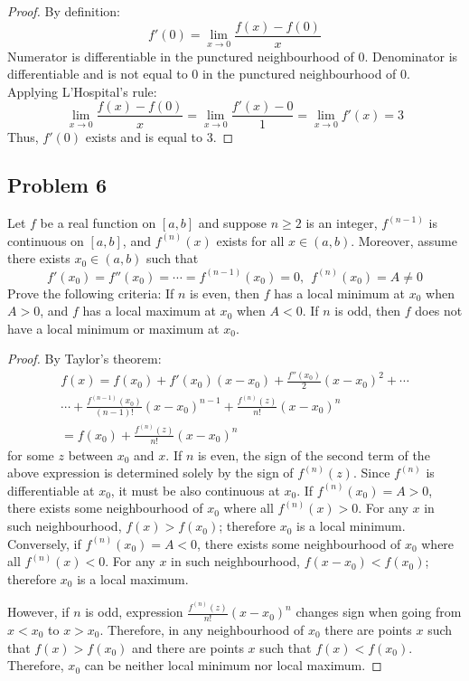 \documentclass{article}
\begin{document}
\begin{proof}

By definition:
\[ f'(0) = \lim_{x \to 0} \frac{f(x)-f(0)}{x} \]
Numerator is differentiable in the punctured neighbourhood of $0$.
Denominator is differentiable and is not equal to $0$ in the punctured neighbourhood of $0$.
Applying L'Hospital's rule:
\[ \lim_{x \to 0} \frac{f(x)-f(0)}{x} = \lim_{x \to 0} \frac{f'(x)-0}{1} =  \lim_{x \to 0} f'(x) = 3 \]
Thus, $f'(0)$ exists and is equal to $3$.

\end{proof}


\subsection*{Problem 6}

\begin{tcolorbox}
Let $f$ be a real function on $[a, b]$ and suppose $n \geq 2$ is an integer, $f^{(n-1)}$ is continuous on $[a, b]$, and $f^{(n)}(x)$ exists for all $x \in (a, b)$.
Moreover, assume there exists $x_0 \in (a, b)$ such that
\[ f'(x_0) = f''(x_0) = \cdots = f^{(n-1)}(x_0) = 0, \>\> f^{(n)}(x_0) = A \neq 0 \]
Prove the following criteria:
If $n$ is even, then $f$ has a local minimum at $x_0$ when $A > 0$, and $f$ has a local maximum at $x_0$ when $A < 0$.
If $n$ is odd, then $f$ does not have a local minimum or maximum at $x_0$.
\end{tcolorbox}

\begin{proof}

By Taylor's theorem:
\begin{multline*}
    f(x) = f(x_0) + f'(x_0)(x-x_0) + \frac{f''(x_0)}{2}(x-x_0)^2 + \cdots \\
    \cdots + \frac{f^{(n-1)}(x_0)}{(n-1)!}(x-x_0)^{n-1} + \frac{f^{(n)}(z)}{n!}(x-x_0)^n \\
    = f(x_0) + \frac{f^{(n)}(z)}{n!}(x-x_0)^n    
\end{multline*}
for some $z$ between $x_0$ and $x$.
If $n$ is even, the sign of the second term of the above expression is determined solely by the sign of $f^{(n)}(z)$.
Since $f^{(n)}$ is differentiable at $x_0$, it must be also continuous at $x_0$.
If $f^{(n)}(x_0) = A > 0$, there exists some neighbourhood of $x_0$ where all $f^{(n)}(x)>0$.
For any $x$ in such neighbourhood, $f(x) > f(x_0)$; therefore $x_0$ is a local minimum.
Conversely, if $f^{(n)}(x_0) = A < 0$, there exists some neighbourhood of $x_0$ where all $f^{(n)}(x)<0$.
For any $x$ in such neighbourhood, $f(x-x_0) < f(x_0)$; therefore $x_0$ is a local maximum.

However, if $n$ is odd, expression $\frac{f^{(n)}(z)}{n!}(x-x_0)^n$ changes sign when going from $x < x_0$ to $x > x_0$.
Therefore, in any neighbourhood of $x_0$ there are points $x$ such that $f(x)>f(x_0)$ and there are points $x$ such that $f(x)<f(x_0)$.
Therefore, $x_0$ can be neither local minimum nor local maximum.

\end{proof}
\end{document}

